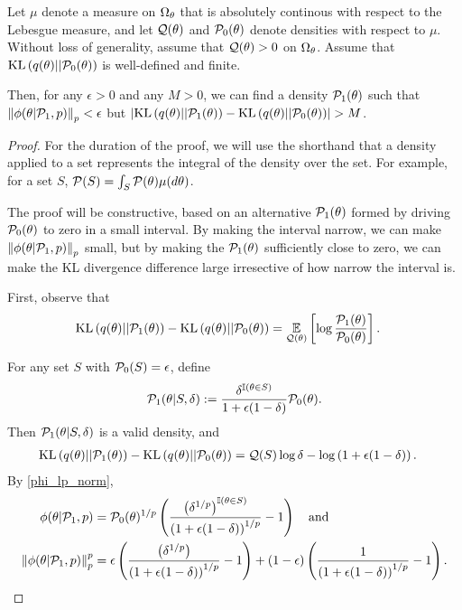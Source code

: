 \begin{thm}
%
Let $\mu$ denote a measure on $\Omega_{\theta}$ that is absolutely continous
with respect to the Lebesgue measure, and let $\mathcal{Q}(\theta)$ and
$\mathcal{P}_{0}(\theta)$ denote densities with respect to $\mu$.  Without loss of
generality, assume that $\mathcal{Q}(\theta) > 0$ on $\Omega_{\theta}$.  Assume that
$\mathrm{KL}\left(q(\theta) || \mathcal{P}_{0}(\theta)\right)$ is well-defined and finite.

Then, for any $\epsilon > 0$ and any $M > 0$, we can find a density
$\mathcal{P}_{1}(\theta)$ such that $\left\Vert\phi(\theta \vert \mathcal{P}_{1}, p)\right\Vert_p < \epsilon$ but
$\left|\mathrm{KL}\left(q(\theta) || \mathcal{P}_{1}(\theta)\right) - \mathrm{KL}\left(q(\theta) || \mathcal{P}_{0}(\theta)\right)\right| > M$.

\begin{proof}
%
For the duration of the proof, we will use the shorthand that a density
applied to a set represents the integral of the density over the set.
For example, for a set $S$, $\mathcal{P}(S) = \int_S \mathcal{P}(\theta)\mu(d\theta)$.

The proof will be constructive, based on an alternative $\mathcal{P}_{1}(\theta)$ formed
by driving $\mathcal{P}_{0}(\theta)$ to zero in a small interval.  By making the interval
narrow, we can make $\left\Vert\phi(\theta \vert \mathcal{P}_{1}, p)\right\Vert_p$ small, but by making
the $\mathcal{P}_{1}(\theta)$ sufficiently close to zero, we can make the KL divergence
difference large irresective of how narrow the interval is.

First, observe that
%
\begin{align*}
%
\KL{q(\theta) || \palt(\theta)} -
\KL{q(\theta) || \pbase(\theta)} ={}&
\expect{\q(\theta)}{\log \frac{\palt(\theta)}{\pbase(\theta)}}.
%
\end{align*}

For any set $S$ with $\mathcal{P}_{0}(S) = \epsilon$, define
%
\begin{align*}
%
\palt(\theta \vert S, \delta) :=
    \frac{\delta^{\ind{\theta \in S}}}{1 + \epsilon(1 - \delta)} \pbase(\theta).
%
\end{align*}
%
Then $\mathcal{P}_{1}(\theta \vert S, \delta)$ is a valid density, and
%
\begin{align*}
%
\KL{q(\theta) || \palt(\theta)} - \KL{q(\theta) || \pbase(\theta)}
    ={}& \q(S) \log \delta - \log\left( 1 + \epsilon(1 - \delta) \right).
%
\end{align*}
%
By \eqref{phi_lp_norm},
%
\begin{align*}
%
\phi(\theta \vert \palt, p) ={}&
    \pbase(\theta)^{1/p} \left(
        \frac{\left(\delta^{1/p}\right)^{\ind{\theta \in S}}}
             {\left( 1 + \epsilon(1 - \delta) \right)^{1/p}} - 1 \right) \mathand\\
\norm{\phi(\theta \vert \palt, p)}_p^p ={}&
\epsilon \left(
   \frac{\left(\delta^{1/p}\right)}
        {\left( 1 + \epsilon(1 - \delta) \right)^{1/p}} - 1 \right) +
(1 - \epsilon) \left(
   \frac{1}
        {\left( 1 + \epsilon(1 - \delta) \right)^{1/p}} - 1 \right).
%
\end{align*}


\end{proof}
\end{thm}
